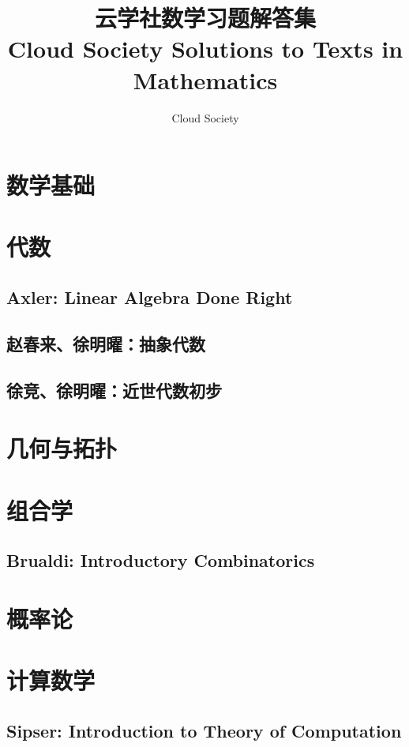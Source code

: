 \documentclass{book} %
\begin{document}
\Large

\title{\textbf{云学社数学习题解答集\\ Cloud Society Solutions to Texts in Mathematics}}  %
\author{Cloud Society} %

\maketitle
\large

\renewcommand{\contentsname}{\centerline{目录}}
\tableofcontents  %

\setlength{\parindent}{0pt}

\mainmatter

\part{数学基础}

\part{代数}
\chapter{Axler: Linear Algebra Done Right}


\chapter{赵春来、徐明曜：抽象代数}


\chapter{徐竞、徐明曜：近世代数初步}


\part{几何与拓扑}


\part{组合学}
\chapter{Brualdi: Introductory Combinatorics}


\part{概率论}


\part{计算数学}

\chapter{Sipser: Introduction to Theory of Computation}

\end{document}
